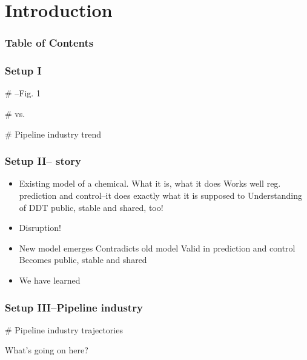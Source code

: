 
\section{Introduction}
\begin{frame}
	\frametitle{Table of Contents}
\end{frame}

\begin{frame}
	\frametitle{Setup I}
	\# \citet{Maguire2009}--Fig. 1

	\# vs.

	\# Pipeline industry trend
\end{frame}

\begin{frame}
	\frametitle{Setup II--\citet{Maguire2009} story}
	\begin{itemize}
		\item Existing model of a chemical.
			\subitem What it is, what it does
			\subitem Works well reg. prediction and control--it does exactly what it is supposed to
			\subitem Understanding of DDT public, stable and shared, too!
		\item Disruption!
		\item New model emerges
			\subitem Contradicts old model
			\subitem Valid in prediction and control
			\subitem Becomes public, stable and shared
		\item We have learned
	\end{itemize}
\end{frame}

\begin{frame}
	\frametitle{Setup III--Pipeline industry}
	\# Pipeline industry trajectories
\end{frame}

\blackgroup
\begin{frame}[plain]
	What's going on here?
\end{frame}
\egroup

